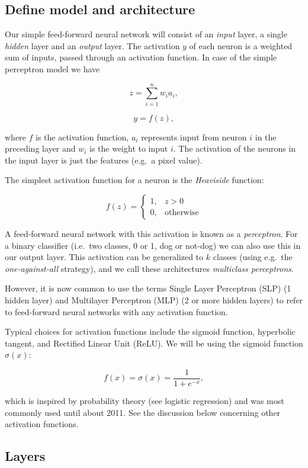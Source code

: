 \documentclass[%
oneside,                 %
final,                   %
10pt]{article}
\begin{document}
\subsection{Define model and architecture}

Our simple feed-forward neural network will consist of an \emph{input} layer, a single \emph{hidden} layer and an \emph{output} layer. The activation $y$ of each neuron is a weighted sum of inputs, passed through an activation function. In case of the simple perceptron model we have 

$$ z = \sum_{i=1}^n w_i a_i ,$$

$$ y = f(z) ,$$

where $f$ is the activation function, $a_i$ represents input from neuron $i$ in the preceding layer
and $w_i$ is the weight to input $i$.  
The activation of the neurons in the input layer is just the features (e.g.~a pixel value).  

The simplest activation function for a neuron is the \emph{Heaviside} function:

$$ f(z) = 
\begin{cases}
1,  &  z > 0\\
0,  & \text{otherwise}
\end{cases}
$$

A feed-forward neural network with this activation is known as a \emph{perceptron}.  
For a binary classifier (i.e.~two classes, 0 or 1, dog or not-dog) we can also use this in our output layer.  
This activation can be generalized to $k$ classes (using e.g.~the \emph{one-against-all} strategy), 
and we call these architectures \emph{multiclass perceptrons}.  

However, it is now common to use the terms Single Layer Perceptron (SLP) (1 hidden layer) and  
Multilayer Perceptron (MLP) (2 or more hidden layers) to refer to feed-forward neural networks with any activation function.  

Typical choices for activation functions include the sigmoid function, hyperbolic tangent, and Rectified Linear Unit (ReLU).  
We will be using the sigmoid function $\sigma(x)$:  

$$ f(x) = \sigma(x) = \frac{1}{1 + e^{-x}} ,$$

which is inspired by probability theory (see logistic regression) and was most commonly used until about 2011. See the discussion below concerning other activation functions.

\subsection{Layers}
\end{document}
